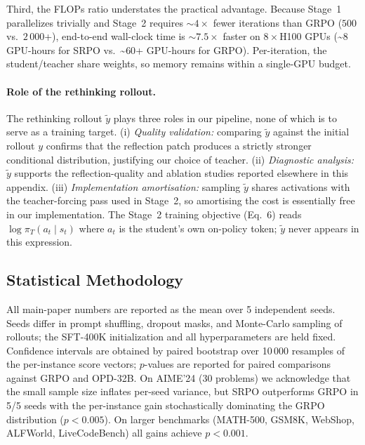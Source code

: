 \documentclass{article}
\newcommand{\method}{SRPO}
\theoremstyle{plain}
\theoremstyle{definition}
\theoremstyle{remark}
\begin{document}
Third, the FLOPs ratio understates the practical advantage.
Because Stage~1 parallelizes trivially and Stage~2 requires $\sim$$4\times$ fewer iterations than GRPO ($500$ vs.\ $2\,000$+), end-to-end wall-clock time is $\sim$$7.5\times$ faster on $8\times$H100 GPUs (\textasciitilde$8$ GPU-hours for \method{} vs.\ \textasciitilde$60$+ GPU-hours for GRPO).
Per-iteration, the student/teacher share weights, so memory remains within a single-GPU budget.

\paragraph{Role of the rethinking rollout.}
The rethinking rollout $\tilde{y}$ plays three roles in our pipeline, none of which is to serve as a training target. (i) \emph{Quality validation:} comparing $\tilde{y}$ against the initial rollout $y$ confirms that the reflection patch produces a strictly stronger conditional distribution, justifying our choice of teacher. (ii) \emph{Diagnostic analysis:} $\tilde{y}$ supports the reflection-quality and ablation studies reported elsewhere in this appendix. (iii) \emph{Implementation amortisation:} sampling $\tilde{y}$ shares activations with the teacher-forcing pass used in Stage~2, so amortising the cost is essentially free in our implementation. The Stage~2 training objective (Eq.~6) reads $\log\pi_T(a_t\mid s_t)$ where $a_t$ is the student's own on-policy token; $\tilde{y}$ never appears in this expression.

\subsection{Statistical Methodology}
\label{appendix:statistical}

All main-paper numbers are reported as the mean over 5 independent seeds.
Seeds differ in prompt shuffling, dropout masks, and Monte-Carlo sampling of rollouts; the SFT-400K initialization and all hyperparameters are held fixed.
Confidence intervals are obtained by paired bootstrap over 10\,000 resamples of the per-instance score vectors; $p$-values are reported for paired comparisons against GRPO and OPD-32B.
On AIME'24 (30 problems) we acknowledge that the small sample size inflates per-seed variance, but \method{} outperforms GRPO in 5/5 seeds with the per-instance gain stochastically dominating the GRPO distribution ($p<0.005$).
On larger benchmarks (MATH-500, GSM8K, WebShop, ALFWorld, LiveCodeBench) all gains achieve $p<0.001$.
\end{document}
